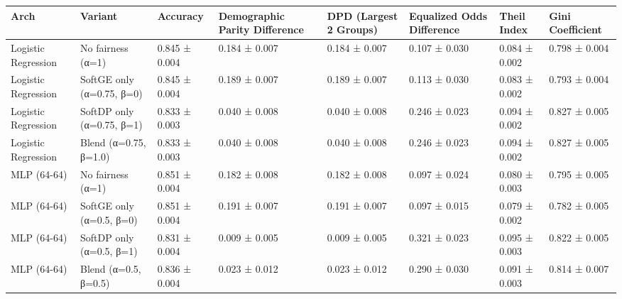 \begin{tabular}{llllllll}
\toprule
Arch & Variant & Accuracy & Demographic Parity Difference & DPD (Largest 2 Groups) & Equalized Odds Difference & Theil Index & Gini Coefficient \\
\midrule
Logistic Regression & No fairness (α=1) & 0.845 ± 0.004 & 0.184 ± 0.007 & 0.184 ± 0.007 & 0.107 ± 0.030 & 0.084 ± 0.002 & 0.798 ± 0.004 \\
Logistic Regression & SoftGE only (α=0.75, β=0) & 0.845 ± 0.004 & 0.189 ± 0.007 & 0.189 ± 0.007 & 0.113 ± 0.030 & 0.083 ± 0.002 & 0.793 ± 0.004 \\
Logistic Regression & SoftDP only (α=0.75, β=1) & 0.833 ± 0.003 & 0.040 ± 0.008 & 0.040 ± 0.008 & 0.246 ± 0.023 & 0.094 ± 0.002 & 0.827 ± 0.005 \\
Logistic Regression & Blend (α=0.75, β=1.0) & 0.833 ± 0.003 & 0.040 ± 0.008 & 0.040 ± 0.008 & 0.246 ± 0.023 & 0.094 ± 0.002 & 0.827 ± 0.005 \\
MLP (64-64) & No fairness (α=1) & 0.851 ± 0.004 & 0.182 ± 0.008 & 0.182 ± 0.008 & 0.097 ± 0.024 & 0.080 ± 0.003 & 0.795 ± 0.005 \\
MLP (64-64) & SoftGE only (α=0.5, β=0) & 0.851 ± 0.004 & 0.191 ± 0.007 & 0.191 ± 0.007 & 0.097 ± 0.015 & 0.079 ± 0.002 & 0.782 ± 0.005 \\
MLP (64-64) & SoftDP only (α=0.5, β=1) & 0.831 ± 0.004 & 0.009 ± 0.005 & 0.009 ± 0.005 & 0.321 ± 0.023 & 0.095 ± 0.003 & 0.822 ± 0.005 \\
MLP (64-64) & Blend (α=0.5, β=0.5) & 0.836 ± 0.004 & 0.023 ± 0.012 & 0.023 ± 0.012 & 0.290 ± 0.030 & 0.091 ± 0.003 & 0.814 ± 0.007 \\
\bottomrule
\end{tabular}
